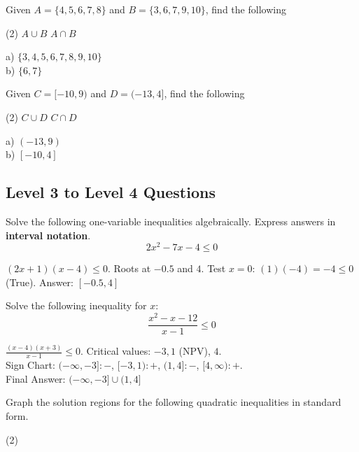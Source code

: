 \documentclass[12pt]{exam}
\begin{document}
\begin{questions}
\pagebreak
\question Given $A=\{4,5,6,7,8\}$ and $B=\{3,6,7,9,10 \}$, find the following
\begin{tasks}(2)
    \task $A\cup B$ \task $A\cap B$
\end{tasks}
\begin{solution}
    a) $\{3, 4, 5, 6, 7, 8, 9, 10\}$ \\
    b) $\{6, 7\}$
\end{solution}
\svert[0.5]
\question Given $C=[-10,9)$ and $D=(-13,4]$, find the following
\begin{tasks}(2)
    \task $C\cup D$ \task $C\cap D$
\end{tasks}
\begin{solution}
    a) $(-13, 9)$ \\
    b) $[-10, 4]$
\end{solution}
\svert[1]

\subsection*{Level 3 to Level 4 Questions}

\question Solve the following one-variable inequalities algebraically. Express answers in \textbf{interval notation}.
    $$2x^2 - 7x - 4 \leq 0$$

\begin{solution}
    $(2x+1)(x-4) \leq 0$. Roots at $-0.5$ and $4$. Test $x=0$: $(1)(-4) = -4 \leq 0$ (True). Answer: $[-0.5, 4]$
\end{solution}
\svert[1.5]

\question Solve the following inequality for $x$:
\[ \dfrac{x^2 - x - 12}{x - 1} \leq 0 \]
\begin{solution}
    $\frac{(x-4)(x+3)}{x-1} \leq 0$. Critical values: $-3, 1$ (NPV), $4$. \\
    Sign Chart: $(-\infty, -3]: -$, $[-3, 1): +$, $(1, 4]: -$, $[4, \infty): +$. \\
    Final Answer: $(-\infty, -3] \cup (1, 4]$
\end{solution}
\svert[2]

\pagebreak

\question Graph the solution regions for the following quadratic inequalities in standard form.

\begin{tasks}(2)


\end{tasks}
\end{questions}
\end{document}
